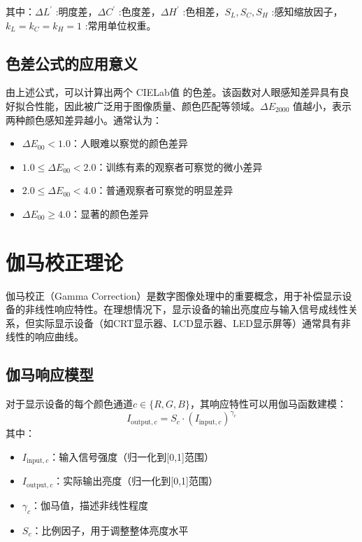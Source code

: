 其中：$\Delta L^{'}$ :明度差，$\Delta C^{'}$ :色度差，$\Delta H^{'}$ :色相差，$S_{L},S_{C},S_{H}$ :感知缩放因子，$k_{L}=k_{C}=k_{H}=1$ :常用单位权重。

\subsection[\hspace{-2pt}色差公式的应用意义]{{\heiti{} \hspace{-8pt}色差公式的应用意义}}\label{subsection2: 色差公式的应用意义}

由上述公式，可以计算出两个 CIELab值 的色差。该函数对人眼感知差异具有良好拟合性能，因此被广泛用于图像质量、颜色匹配等领域。$\Delta E_{2000}$ 值越小，表示两种颜色感知差异越小。通常认为：
\begin{itemize}
    \item $\Delta E_{00} < 1.0$：人眼难以察觉的颜色差异
    \item $1.0 \leq \Delta E_{00} < 2.0$：训练有素的观察者可察觉的微小差异
    \item $2.0 \leq \Delta E_{00} < 4.0$：普通观察者可察觉的明显差异
    \item $\Delta E_{00} \geq 4.0$：显著的颜色差异
\end{itemize}

\section[\hspace{-2pt}伽马校正理论]{{\heiti{} \hspace{-8pt}伽马校正理论}}\label{section2: 伽马校正理论}

伽马校正（Gamma Correction）是数字图像处理中的重要概念，用于补偿显示设备的非线性响应特性。在理想情况下，显示设备的输出亮度应与输入信号成线性关系，但实际显示设备（如CRT显示器、LCD显示器、LED显示屏等）通常具有非线性的响应曲线。\cite{gamma_correction}

\subsection[\hspace{-2pt}伽马响应模型]{{\heiti{} \hspace{-8pt}伽马响应模型}}\label{subsection2: 伽马响应模型}

对于显示设备的每个颜色通道$c \in \{R,G,B\}$，其响应特性可以用伽马函数建模：
\begin{equation}
I_{\text{output},c} = S_c \cdot (I_{\text{input},c})^{\gamma_c}
\end{equation}
其中：
\begin{itemize}
    \item $I_{\text{input},c}$：输入信号强度（归一化到[0,1]范围）
    \item $I_{\text{output},c}$：实际输出亮度（归一化到[0,1]范围）
    \item $\gamma_c$：伽马值，描述非线性程度
    \item $S_c$：比例因子，用于调整整体亮度水平
\end{itemize}

